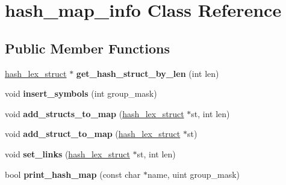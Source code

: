 \hypertarget{classhash__map__info}{}\section{hash\+\_\+map\+\_\+info Class Reference}
\label{classhash__map__info}
\subsection*{Public Member Functions}
\begin{DoxyCompactItemize}
\item 
\mbox{\label{classhash__map__info_a93499f4adac8ec53a4463a4e4fe9803c}} 
\mbox{\hyperlink{structhash__lex__struct}{hash\+\_\+lex\+\_\+struct}} $\ast$ {\bfseries get\+\_\+hash\+\_\+struct\+\_\+by\+\_\+len} (int len)
\item 
\mbox{\label{classhash__map__info_a903a704aff43674e48d936f3f4cf9740}} 
void {\bfseries insert\+\_\+symbols} (int group\+\_\+mask)
\item 
\mbox{\label{classhash__map__info_aaf44037c412288b33a40a4443354b2f3}} 
void {\bfseries add\+\_\+structs\+\_\+to\+\_\+map} (\mbox{\hyperlink{structhash__lex__struct}{hash\+\_\+lex\+\_\+struct}} $\ast$st, int len)
\item 
\mbox{\label{classhash__map__info_aaee7545c39a9f32b2bc921dfe2005a90}} 
void {\bfseries add\+\_\+struct\+\_\+to\+\_\+map} (\mbox{\hyperlink{structhash__lex__struct}{hash\+\_\+lex\+\_\+struct}} $\ast$st)
\item 
\mbox{\label{classhash__map__info_a428021a59854c4e83b459364921058de}} 
void {\bfseries set\+\_\+links} (\mbox{\hyperlink{structhash__lex__struct}{hash\+\_\+lex\+\_\+struct}} $\ast$st, int len)
\item 
\mbox{\label{classhash__map__info_ac26a29e5b707cacd6e504484cf6754be}} 
bool {\bfseries print\+\_\+hash\+\_\+map} (const char $\ast$name, uint group\+\_\+mask)
\end{DoxyCompactItemize}

